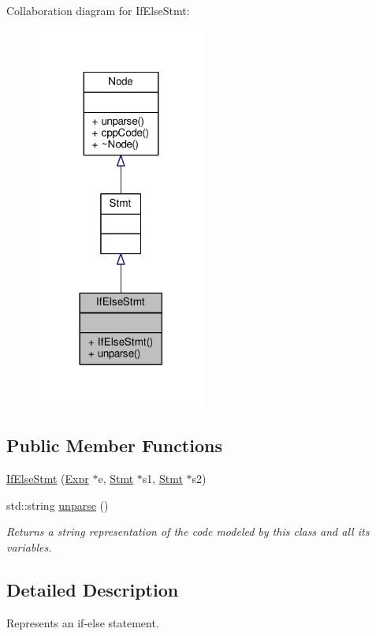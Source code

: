 Collaboration diagram for If\-Else\-Stmt\-:\nopagebreak
\begin{figure}[H]
\begin{center}
\leavevmode
\includegraphics[width=158pt]{classIfElseStmt__coll__graph}
\end{center}
\end{figure}
\subsection*{Public Member Functions}
\begin{DoxyCompactItemize}
\item 
\hyperlink{classIfElseStmt_a9e0fde33a0889aa64175dfdf7e7326da}{If\-Else\-Stmt} (\hyperlink{classExpr}{Expr} $\ast$e, \hyperlink{classStmt}{Stmt} $\ast$s1, \hyperlink{classStmt}{Stmt} $\ast$s2)
\item 
std\-::string \hyperlink{classIfElseStmt_a2e8c850644f33e4ba918c53d0212e59f}{unparse} ()
\begin{DoxyCompactList}\small\item\em Returns a string representation of the code modeled by this class and all its variables. \end{DoxyCompactList}\end{DoxyCompactItemize}


\subsection{Detailed Description}
Represents an if-\/else statement. \par
 

